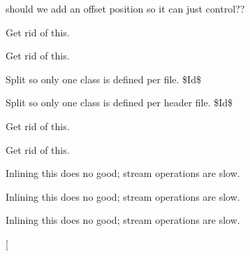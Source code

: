 \begin{DoxyRefList}
should we add an offset position so it can just control??  
\item[\label{todo__todo000051}%
\hypertarget{todo__todo000051}{}%
Member \hyperlink{class_j_early_model_a77fca3da35b411aaac33269b22f4cddc}{J\-Early\-Model\-:\-:setup} (\hyperlink{classtg_world}{tg\-World} \&world)]Get rid of this.  
\item[\label{todo__todo000052}%
\hypertarget{todo__todo000052}{}%
Member \hyperlink{class_j_early_model_a0883e6fcb262de284dcca1bc91b76154}{J\-Early\-Model\-:\-:teardown} ()]Get rid of this.  
\item[\label{todo__todo000005}%
\hypertarget{todo__todo000005}{}%
File \hyperlink{_muscle2_p_8cpp}{Muscle2\-P.cpp} ]Split so only one class is defined per file. \$\-Id\$  
\item[\label{todo__todo000006}%
\hypertarget{todo__todo000006}{}%
File \hyperlink{_muscle2_p_8h}{Muscle2\-P.h} ]Split so only one class is defined per header file. \$\-Id\$  
\item[\label{todo__todo000053}%
\hypertarget{todo__todo000053}{}%
Member \hyperlink{class_nested_spiral_spine_a87ca6b8b6482b448be5826e7fef49287}{Nested\-Spiral\-Spine\-:\-:setup} (\hyperlink{classtg_world}{tg\-World} \&world)]Get rid of this.  
\item[\label{todo__todo000054}%
\hypertarget{todo__todo000054}{}%
Member \hyperlink{class_nested_spiral_spine_aea6ab5feee049adfb73835c848366392}{Nested\-Spiral\-Spine\-:\-:teardown} ()]Get rid of this.  
\item[\label{todo__todo000106}%
\hypertarget{todo__todo000106}{}%
Member \hyperlink{tg_structure_info_8h_a9ab7cd01b53c61486c9a319ec7e62107}{operator$<$$<$} (std\-::ostream \&os, const \hyperlink{classtg_structure_info}{tg\-Structure\-Info} \&obj)]Inlining this does no good; stream operations are slow.  
\item[\label{todo__todo000015}%
\hypertarget{todo__todo000015}{}%
Member \hyperlink{tg_model_8h_a2a689ee3da32701c6ee9352145507f66}{operator$<$$<$} (std\-::ostream \&os, const \hyperlink{classtg_model}{tg\-Model} \&obj)]Inlining this does no good; stream operations are slow.  
\item[\label{todo__todo000082}%
\hypertarget{todo__todo000082}{}%
Member \hyperlink{tg_nodes_8h_a997ccdea7c3189facd4acdba444532bc}{operator$<$$<$} (std\-::ostream \&os, const \hyperlink{classtg_nodes}{tg\-Nodes} \&n)]Inlining this does no good; stream operations are slow.  
\item[\label{todo__todo000024}%
\hypertarget{todo__todo000024}{}%

\end{DoxyRefList}
